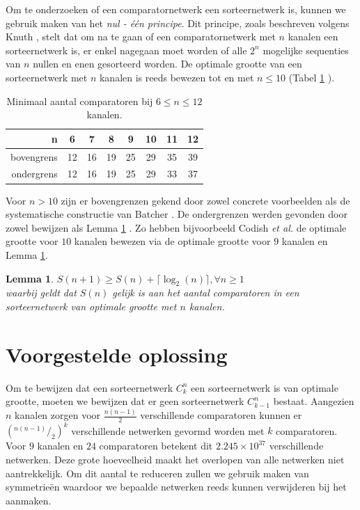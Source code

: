 \documentclass{article}
\newtheorem{lemma}{Lemma}
\begin{document}
Om te onderzoeken of een comparatornetwerk een sorteernetwerk is, kunnen we gebruik maken van het \textit{nul - \'e\'en principe}. 
Dit principe, zoals beschreven volgens Knuth \cite{Knuth3}, stelt dat om na te gaan of een comparatornetwerk met $n$ kanalen een sorteernetwerk is, er enkel nagegaan moet worden of alle $2^n$ mogelijke sequenties van $n$ nullen en enen gesorteerd worden.
De optimale grootte van een sorteernetwerk met $n$ kanalen is reeds bewezen tot en met $n \leq 10$ (Tabel \ref{tabel1} \cite{sortingNetworksSize2014}).
\begin{table}[h!]
	\centering
	\begin{tabular}{r|c|c|c|c|c|c|c}
	n & 6 & 7 & 8 & 9 & 10 & 11 & 12\\ 
	\hline 
	bovengrens & 12 & 16 & 19 & 25 & 29 & 35 & 39\\ 
	\hline 
	ondergrens & 12 & 16 & 19 & 25& 29 & 33 & 37\\
	\end{tabular} 
	\caption{Minimaal aantal comparatoren bij $6 \leq n \leq 12$ kanalen.}
	\label{tabel1}
\end{table}

Voor $n > 10$ zijn er bovengrenzen gekend door zowel concrete voorbeelden als de systematische constructie van Batcher \cite{sortingNetworksApplications}. 
De ondergrenzen werden gevonden door zowel bewijzen als Lemma \ref{lemma1} \cite{Voorhis1972}.
Zo hebben bijvoorbeeld Codish \textit{et al.} de optimale grootte voor $10$ kanalen bewezen via de optimale grootte voor $9$ kanalen en Lemma \ref{lemma1}.
\begin{lemma}
	$S(n+1) \geq S(n) + \lceil \log_2(n) \rceil, \forall n \geq 1$\\
	waarbij geldt dat $S(n)$ gelijk is aan het aantal comparatoren in een sorteernetwerk van optimale grootte met $n$ kanalen.
	\label{lemma1}
\end{lemma}

\newcommand*\rfrac[2]{{}^{#1}\!/_{#2}}
\section{Voorgestelde oplossing}\label{VoorgesteldeOplossing}
Om te bewijzen dat een sorteernetwerk $C^n_k$ een sorteernetwerk is van optimale grootte, moeten we bewijzen dat er geen sorteernetwerk $C^n_{k-1}$ bestaat.
Aangezien $n$ kanalen zorgen voor $\frac{n \left(n-1\right)}{2}$ verschillende comparatoren kunnen er $\left(\rfrac{n \left(n-1\right)}{2}\right) ^k$ verschillende netwerken gevormd worden met  $k$ comparatoren.
Voor $9$ kanalen en $24$ comparatoren betekent dit $2.245 \times 10^{37}$ verschillende netwerken.
Deze grote hoeveelheid maakt het overlopen van alle netwerken niet aantrekkelijk.
Om dit aantal te reduceren zullen we gebruik maken van symmetrie\"en waardoor we bepaalde netwerken reeds kunnen verwijderen bij het aanmaken.
\end{document}
